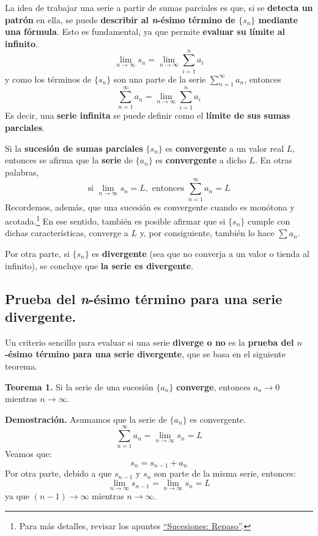 \documentclass[12pt]{article}
\begin{document}
La idea de trabajar una serie a partir de sumas parciales es que, si se \textbf{detecta un patrón} en ella, se puede \textbf{describir al \textit{n}-ésimo término de $\{s_{n}\}$ mediante una fórmula}. Esto es fundamental, ya que permite \textbf{evaluar su límite al infinito}.
\[
  \lim_{n \to \infty} s_{n} = \lim_{n \to \infty} \sum_{i = 1}^{n} a_{i}
\]
y como los términos de $\{s_{n}\}$ son una parte de la serie $\sum_{n = 1}^{\infty} a_{n}$, entonces
\[
  \sum_{n = 1}^{\infty} a_{n} = \lim_{n \to \infty} \sum_{i = 1}^{n} a_{i}
\]
Es decir, una \textbf{serie infinita} se puede definir como el \textbf{límite de sus sumas parciales}.

Si la \textbf{sucesión de sumas parciales} $\{s_{n}\}$ es \textbf{convergente} a un valor real $L$, entonces se afirma que la \textbf{serie} de $\{a_{n}\}$ es \textbf{convergente} a dicho $L$. En otras palabras,
\[
  \text{si } \lim_{n \to \infty} s_{n} = L, \text{ entonces } \sum_{n = 1}^{\infty} a_{n} = L
\]
Recordemos, además, que una sucesión es convergente cuando es monótona y acotada.\footnote{Para más detalles, revisar los apuntes \href{/sucesiones-repaso/sucesiones-repaso.pdf}{``Sucesiones: Repaso''}.} En ese sentido, también es posible afirmar que si $\{s_{n}\}$ cumple con dichas características, converge a $L$ y, por consiguiente, también lo hace $\sum a_{n}$.

Por otra parte, si $\{s_{n}\}$ es \textbf{divergente} (sea que no converja a un valor o tienda al infinito), se concluye que \textbf{la serie es divergente}.

\subsection{Prueba del \textit{n}-ésimo término para una serie divergente.}

Un criterio sencillo para evaluar si una serie \textbf{diverge o no} es la \textbf{prueba del $n$-ésimo término para una serie divergente}, que se basa en el siguiente teorema.

\textbf{Teorema 1.} Si la serie de una sucesión $\{a_{n}\}$ \textbf{converge}, entonces $a_{n} \to 0$ mientras $n \to \infty$.

\textbf{Demostración.} Asumamos que la serie de $\{a_{n}\}$ es convergente.
\[
  \sum_{n = 1}^{\infty} a_{n} = \lim_{n \to \infty} s_{n} = L
\]
Veamos que:
\[
  s_{n} = s_{n - 1} + a_{n}
\]
Por otra parte, debido a que $s_{n - 1}$ y $s_{n}$ son parte de la misma serie, entonces:
\[
  \lim_{n \to \infty} s_{n - 1} = \lim_{n \to \infty} s_{n} = L
\]
ya que $(n - 1) \to \infty$ mientras $n \to \infty$.
\end{document}

